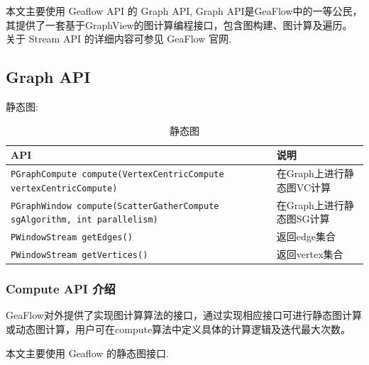 本文主要使用 Geaflow API 的 Graph API, Graph API是GeaFlow中的一等公民，其提供了一套基于GraphView的图计算编程接口，包含图构建、图计算及遍历。
关于 Stream API 的详细内容可参见 GeaFlow 官网\cite{ref1}.

\subsection{Graph API}
静态图:
\begin{table}[H]
  \caption{静态图}
  \begin{center}
    \begin{tabularx}{\textwidth}{Xl}
      \toprule
      \textbf{API} & \textbf{说明} \\
      \midrule
      \texttt{PGraphCompute compute(VertexCentricCompute vertexCentricCompute)} & 在Graph上进行静态图VC计算 \\
      \texttt{PGraphWindow compute(ScatterGatherCompute sgAlgorithm, int parallelism)} & 在Graph上进行静态图SG计算 \\
      \texttt{PWindowStream getEdges()} & 返回edge集合 \\
      \texttt{PWindowStream getVertices()} & 返回vertex集合 \\
      \bottomrule
    \end{tabularx}
  \end{center}
\end{table}

\subsubsection{Compute API 介绍}
GeaFlow对外提供了实现图计算算法的接口，通过实现相应接口可进行静态图计算或动态图计算，用户可在compute算法中定义具体的计算逻辑及迭代最大次数。

本文主要使用 Geaflow 的静态图接口.

